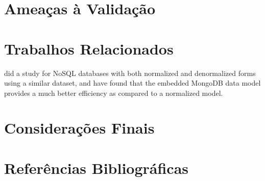 \documentclass[12pt]{article}
\begin{document}
\section{Ameaças à Validação}
\label{section:limitacoes}



\section{Trabalhos Relacionados} 
\label{section:relacionados}

\cite{kanade2014study} did a study for NoSQL databases with both normalized and denormalized forms using a similar dataset, and have found that the embedded MongoDB
data model provides a much better efficiency as compared to a normalized model. 


\section{Considerações Finais}
\label{section:consideracoes}

\section{Referências Bibliográficas}



\end{document}
